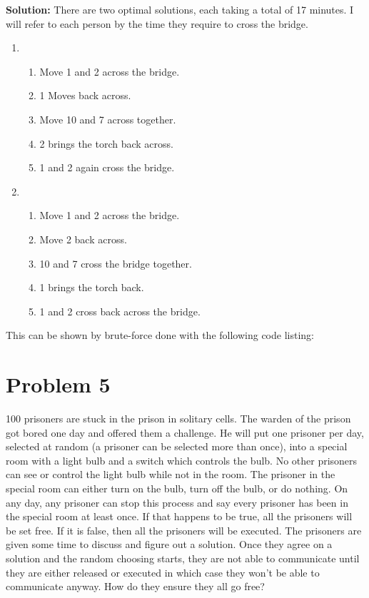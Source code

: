 \documentclass{article}
\providecommand{\soln}{\textbf{Solution: }}
\begin{document}
    \soln There are two optimal solutions, each taking a total of 17 minutes. I will refer to each person by the time they require to cross the bridge.
    \begin{enumerate}
        \item \begin{enumerate}
            \item Move 1 and 2 across the bridge.
            \item 1 Moves back across.
            \item Move 10 and 7 across together.
            \item 2 brings the torch back across.
            \item 1 and 2 again cross the bridge.
        \end{enumerate}
        
        \item \begin{enumerate}
            \item Move 1 and 2 across the bridge.
            \item Move 2 back across.
            \item 10 and 7 cross the bridge together.
            \item 1 brings the torch back.
            \item 1 and 2 cross back across the bridge.
        \end{enumerate}
    \end{enumerate}
    
    This can be shown by brute-force done with the following code listing:
    
    
    
    \section*{Problem 5}
    100 prisoners are stuck in the prison in solitary cells. The warden of the prison
    got bored one day and offered them a challenge. He will put one prisoner per day,
    selected at random (a prisoner can be selected more than once), into a special
    room with a light bulb and a switch which controls the bulb. No other prisoners
    can see or control the light bulb while not in the room. The prisoner in the special
    room can either turn on the bulb, turn off the bulb, or do nothing. On any day, any prisoner can stop this process and say every prisoner has been in the special
    room at least once. If that happens to be true, all the prisoners will be set free.
    If it is false, then all the prisoners will be executed. The prisoners are given some
    time to discuss and figure out a solution. Once they agree on a solution and the
    random choosing starts, they are not able to communicate until they are either
    released or executed in which case they won’t be able to communicate anyway.
    How do they ensure they all go free?
    
\end{document}
